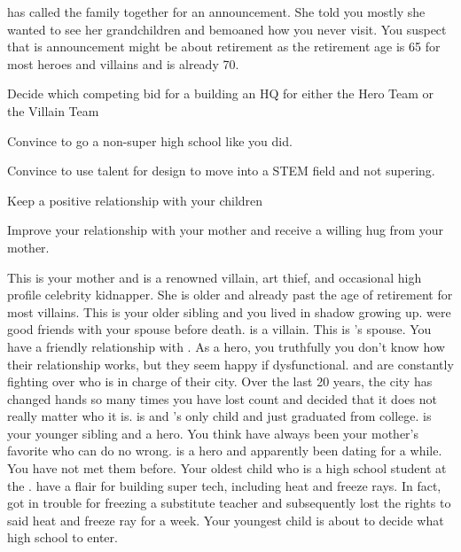 \documentclass[char]{LRSguildcamp1}
\begin{document}
\cGrandma{} has called the family together for an announcement. She told you mostly she wanted to see her grandchildren and bemoaned how you never visit.  You suspect that is announcement might be about \cGrandma{\their} retirement as the retirement age is 65 for most heroes and villains and \cGrandma{\they} is already 70.  


\begin{itemz}[Goals]
	\item Decide which competing bid for a building an HQ for either the Hero Team or the Villain Team
	\item Convince \cTween{} to go a non-super high school like you did.  
	\item Convince \cTeen{} to use \cTeen{\their} talent for design to move into a STEM field and not supering.
	\item Keep a positive relationship with your children
	\item Improve your relationship with your mother and receive a willing hug from your mother.  
	\end{itemz}

\begin{itemz}[Notes]
	\item 
\end{itemz}



\begin{contacts}
	\contact{\cGrandma{}} This is your mother and is a renowned villain, art thief, and occasional high profile celebrity kidnapper. She is older and already past the age of retirement for most villains.
	\contact{\cOldest{}} This is your older sibling and you lived in \cOldest{\their} shadow growing up. \cOldest{\they} were good friends with your spouse before \cAS{\their} death. \cOldest{} is a villain. 
	\contact{\cOS{}} This is \cOldest{}'s spouse. You have a friendly relationship with . As a hero, you truthfully you don't know how their relationship works, but they seem happy if dysfunctional.  \cOldest{} and \cOS{} are constantly fighting over who is in charge of their city.  Over the last 20 years, the city has changed hands so many times you have lost count and decided that it does not really matter who it is. 
	\contact{\cGrad{}} \cGrad{} is \cOldest{} and \cOS{}'s only child and just graduated from college. 
	\contact{\cYoungest{}} \cYoungest{} is your younger sibling and a hero. You think  have always been your mother's favorite who can do no wrong. 
	\contact{\cYS{}} \cYS{} is a hero and apparently been dating \cYoungest{} for a while. You have not met them before. 
	\contact{\cTeen{}} Your oldest child who is a high school student at the \pSuperSchool{}. \cTeen{\they} have a flair for building super tech, including heat and freeze rays. In fact, \cTeen{} got in trouble for freezing a substitute teacher and subsequently lost the rights to said heat and freeze ray for a week. 
	\contact{\cTween{}} Your youngest child is about to decide what high school to enter.
\end{contacts}
\end{document}
